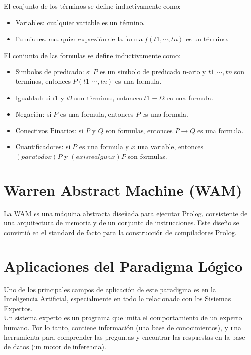 \documentclass[12pt,titlepage]{report}
\begin{document}
El conjunto de los términos se define inductivamente como: \\
\begin{itemize}
    \item Variables: cualquier variable es un término.
    \item Funciones: cualquier expresión de la forma $f(t1,\cdots,tn)$ es un término.
\end{itemize}
El conjunto de las formulas se define inductivamente como: \\
\begin{itemize}
    \item Simbolos de predicado: si $P$ es un simbolo de predicado n-ario y $t1,\cdots,tn$ son terminos, entonces $P(t1,\cdots,tn)$ es una formula.
    \item Igualdad: si $t1$ y $t2$ son términos, entonces $t1=t2$ es una formula.
    \item Negación: si $P$ es una formula, entonces $P$ es una formula. %
    \item Conectivos Binarios: si $P$ y $Q$ son formulas, entonces $P \rightarrow Q$ es una formula. %
    \item Cuantificadores: si $P$ es una formula y $x$ una variable, entonces $(para todo x)P$ y $(existe algun x)P$ son formulas. %
\end{itemize}

\section{Warren Abstract Machine (WAM)}

La WAM es una máquina abstracta diseñada para ejecutar Prolog, consistente de una arquitectura de memoria y de un conjunto de instrucciones. Este diseño se convirtió en el standard de facto para la construcción de compiladores Prolog. \\

\section{Aplicaciones del Paradigma Lógico}

Uno de los principales campos de aplicación de este paradigma es en la Inteligencia Artificial, especialmente en todo lo relacionado con los Sistemas Expertos. \\

Un sistema experto es un programa que imita el comportamiento de un experto humano. Por lo tanto, contiene información (una base de conocimientos), y una herramienta para comprender las preguntas y encontrar las respuestas en la base de datos (un motor de inferencia). \\
\end{document}

